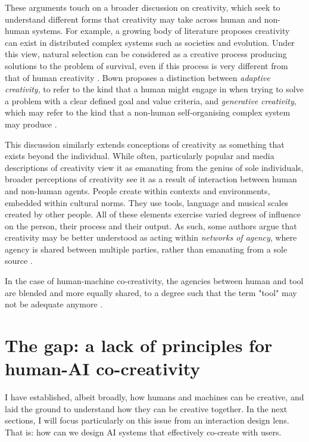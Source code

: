 These arguments touch on a broader discussion on creativity, which seek to understand different forms that creativity may take across human and non-human systems. For example, a growing body of literature proposes creativity can exist in distributed complex systems such as societies and evolution. Under this view, natural selection can be considered as a creative process producing solutions to the problem of survival, even if this process is very different from that of human creativity \cite{Wagner2015-oj}. Bown proposes a distinction between \textit{adaptive creativity}, to refer to the kind that a human might engage in when trying to solve a problem with a clear defined goal and value criteria, and \textit{generative creativity}, which may refer to the kind that a non-human self-organising complex system may produce \cite{Bown2012-gg}. 

This discussion similarly extends conceptions of creativity as something that exists beyond the individual. While often, particularly popular and media descriptions of creativity view it as emanating from the genius of sole individuals, broader perceptions of creativity see it as a result of interaction between human and non-human agents. People create within contexts and environments, embedded within cultural norms. They use tools, language and musical scales created by other people. All of these elements exercise varied degrees of influence on the person, their process and their output. As such, some authors argue that creativity may be better understood as acting within \textit{networks of agency}, where agency is shared between multiple parties, rather than emanating from a sole source \cite{Brown2016-tc, Malafouris2008-xn}. 

In the case of human-machine co-creativity, the agencies between human and tool are blended and more equally shared, to a degree such that the term "tool" may not be adequate anymore \cite{Lawton2023-tb}. 

\section{The gap: a lack of principles for human-AI co-creativity}

I have established, albeit broadly, how humans and machines can be creative, and laid the ground to understand how they can be creative together. In the next sections, I will focus particularly on this issue from an interaction design lens. That is: how can we design AI systems that effectively co-create with users. 

